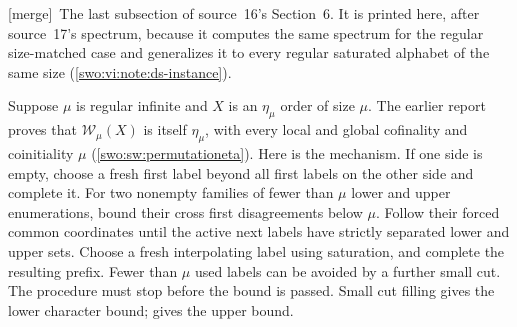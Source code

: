 \documentclass[11pt]{article}
\theoremstyle{definition}
\theoremstyle{remark}
\newcommand{\WO}{\mathcal W}
\newcommand{\merge}{\textsf{[merge]}}
\begin{document}
\merge\ The last subsection of source~16's Section~6. It is printed here,
after source~17's spectrum, because it computes the same spectrum for the
regular size-matched case and generalizes it to every regular saturated
alphabet of the same size (\cref{swo:vi:note:ds-instance}).


Suppose $\mu$ is regular infinite and $X$ is an $\eta_\mu$ order of
size $\mu$. The earlier report proves that $\WO_\mu(X)$ is itself
$\eta_\mu$, with every local and global cofinality and coinitiality
$\mu$ (\cref{swo:sw:permutationeta}).
Here is the mechanism. If one side is empty, choose a fresh first label
beyond all first labels on the other side and complete it. For two
nonempty families of fewer than $\mu$ lower and upper enumerations,
bound their cross first disagreements below $\mu$.
Follow their forced common coordinates until the active next labels have
strictly separated lower and upper sets. Choose a fresh interpolating
label using saturation, and complete the resulting prefix. Fewer than
$\mu$ used labels can be avoided by a further small cut. The procedure
must stop before the bound is passed. Small cut filling gives the lower
character bound;  gives the upper bound.
\end{document}
